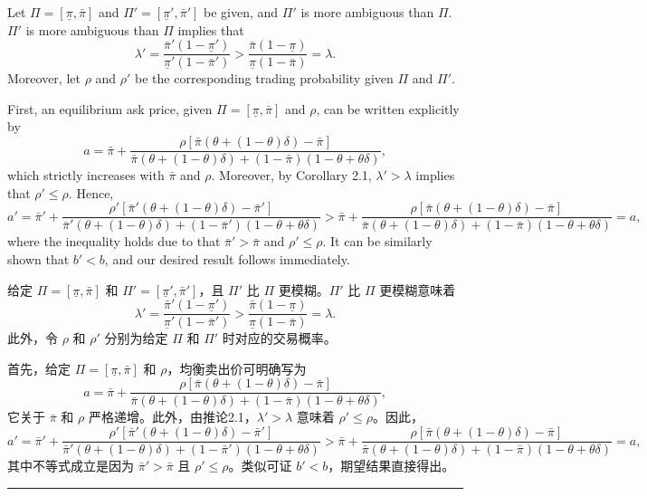 \documentclass[12pt,a4paper]{article}
\newenvironment{original}{%
  \par\vspace{4pt}\noindent%
  \color{black}%
  \ignorespaces
}{%
  \par\vspace{2pt}%
}
\newenvironment{translation}{%
  \par\vspace{2pt}\noindent%
  \color{transblue}%
  \ignorespaces
}{%
  \par\vspace{4pt}\hrule\vspace{6pt}%
}
\begin{document}
\begin{original}
Let $\Pi = [\underline{\pi}, \bar{\pi}]$ and $\Pi' = [\underline{\pi}', \bar{\pi}']$ be given, and $\Pi'$ is more ambiguous than $\Pi$. $\Pi'$ is more ambiguous than $\Pi$ implies that
\[
\lambda' = \frac{\bar{\pi}'(1 - \underline{\pi}')}{\underline{\pi}'(1 - \bar{\pi}')} > \frac{\bar{\pi}(1 - \underline{\pi})}{\underline{\pi}(1 - \bar{\pi})} = \lambda.
\]
Moreover, let $\rho$ and $\rho'$ be the corresponding trading probability given $\Pi$ and $\Pi'$.

First, an equilibrium ask price, given $\Pi = [\underline{\pi}, \bar{\pi}]$ and $\rho$, can be written explicitly by
\[
a = \bar{\pi} + \frac{\rho[\bar{\pi}(\theta + (1-\theta)\delta) - \bar{\pi}]}{\bar{\pi}(\theta + (1-\theta)\delta) + (1-\bar{\pi})(1-\theta+\theta\delta)},
\]
which strictly increases with $\bar{\pi}$ and $\rho$. Moreover, by Corollary 2.1, $\lambda' > \lambda$ implies that $\rho' \leq \rho$. Hence,
\[
a' = \bar{\pi}' + \frac{\rho'[\bar{\pi}'(\theta + (1-\theta)\delta) - \bar{\pi}']}{\bar{\pi}'(\theta + (1-\theta)\delta) + (1-\bar{\pi}')(1-\theta+\theta\delta)}
> \bar{\pi} + \frac{\rho[\bar{\pi}(\theta + (1-\theta)\delta) - \bar{\pi}]}{\bar{\pi}(\theta + (1-\theta)\delta) + (1-\bar{\pi})(1-\theta+\theta\delta)} = a,
\]
where the inequality holds due to that $\bar{\pi}' > \bar{\pi}$ and $\rho' \leq \rho$. It can be similarly shown that $b' < b$, and our desired result follows immediately.
\end{original}
\begin{translation}
给定 $\Pi = [\underline{\pi}, \bar{\pi}]$ 和 $\Pi' = [\underline{\pi}', \bar{\pi}']$，且 $\Pi'$ 比 $\Pi$ 更模糊。$\Pi'$ 比 $\Pi$ 更模糊意味着
\[
\lambda' = \frac{\bar{\pi}'(1 - \underline{\pi}')}{\underline{\pi}'(1 - \bar{\pi}')} > \frac{\bar{\pi}(1 - \underline{\pi})}{\underline{\pi}(1 - \bar{\pi})} = \lambda.
\]
此外，令 $\rho$ 和 $\rho'$ 分别为给定 $\Pi$ 和 $\Pi'$ 时对应的交易概率。

首先，给定 $\Pi = [\underline{\pi}, \bar{\pi}]$ 和 $\rho$，均衡卖出价可明确写为
\[
a = \bar{\pi} + \frac{\rho[\bar{\pi}(\theta + (1-\theta)\delta) - \bar{\pi}]}{\bar{\pi}(\theta + (1-\theta)\delta) + (1-\bar{\pi})(1-\theta+\theta\delta)},
\]
它关于 $\bar{\pi}$ 和 $\rho$ 严格递增。此外，由推论2.1，$\lambda' > \lambda$ 意味着 $\rho' \leq \rho$。因此，
\[
a' = \bar{\pi}' + \frac{\rho'[\bar{\pi}'(\theta + (1-\theta)\delta) - \bar{\pi}']}{\bar{\pi}'(\theta + (1-\theta)\delta) + (1-\bar{\pi}')(1-\theta+\theta\delta)}
> \bar{\pi} + \frac{\rho[\bar{\pi}(\theta + (1-\theta)\delta) - \bar{\pi}]}{\bar{\pi}(\theta + (1-\theta)\delta) + (1-\bar{\pi})(1-\theta+\theta\delta)} = a,
\]
其中不等式成立是因为 $\bar{\pi}' > \bar{\pi}$ 且 $\rho' \leq \rho$。类似可证 $b' < b$，期望结果直接得出。
\end{translation}
\end{document}
